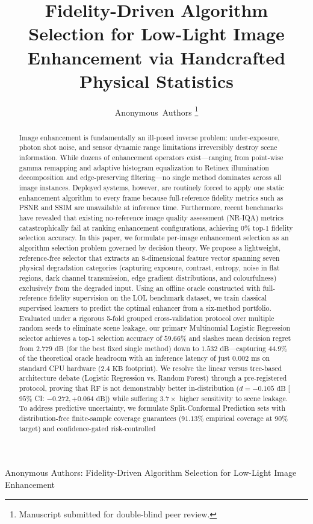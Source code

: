 \documentclass[journal]{IEEEtran}
\begin{document}
\title{Fidelity-Driven Algorithm Selection for Low-Light Image Enhancement via Handcrafted Physical Statistics}

\author{Anonymous~Authors%
\thanks{Manuscript submitted for double-blind peer review.}%
}

%
{Anonymous Authors: Fidelity-Driven Algorithm Selection for Low-Light Image Enhancement}

\maketitle

\begin{abstract}
Image enhancement is fundamentally an ill-posed inverse problem: under-exposure, photon shot noise, and sensor dynamic range limitations irreversibly destroy scene information. While dozens of enhancement operators exist—ranging from point-wise gamma remapping and adaptive histogram equalization to Retinex illumination decomposition and edge-preserving filtering—no single method dominates across all image instances. Deployed systems, however, are routinely forced to apply one static enhancement algorithm to every frame because full-reference fidelity metrics such as PSNR and SSIM are unavailable at inference time. Furthermore, recent benchmarks have revealed that existing no-reference image quality assessment (NR-IQA) metrics catastrophically fail at ranking enhancement configurations, achieving 0\% top-1 fidelity selection accuracy. In this paper, we formulate per-image enhancement selection as an algorithm selection problem governed by decision theory. We propose a lightweight, reference-free selector that extracts an 8-dimensional feature vector spanning seven physical degradation categories (capturing exposure, contrast, entropy, noise in flat regions, dark channel transmission, edge gradient distributions, and colourfulness) exclusively from the degraded input. Using an offline oracle constructed with full-reference fidelity supervision on the LOL benchmark dataset, we train classical supervised learners to predict the optimal enhancer from a six-method portfolio. Evaluated under a rigorous 5-fold grouped cross-validation protocol over multiple random seeds to eliminate scene leakage, our primary Multinomial Logistic Regression selector achieves a top-1 selection accuracy of $59.66\%$ and slashes mean decision regret from $2.779\text{ dB}$ (for the best fixed single method) down to $1.532\text{ dB}$—capturing $44.9\%$ of the theoretical oracle headroom with an inference latency of just $0.002\text{ ms}$ on standard CPU hardware ($2.4\text{ KB}$ footprint). We resolve the linear versus tree-based architecture debate (Logistic Regression vs. Random Forest) through a pre-registered protocol, proving that RF is not demonstrably better in-distribution ($d = -0.105\text{ dB}$ [$95\%$ CI: $-0.272, +0.064\text{ dB}$]) while suffering $3.7\times$ higher sensitivity to scene leakage. To address predictive uncertainty, we formulate Split-Conformal Prediction sets with distribution-free finite-sample coverage guarantees ($91.13\%$ empirical coverage at $90\%$ target) and confidence-gated risk-controlled 
\end{abstract}
\end{document}
